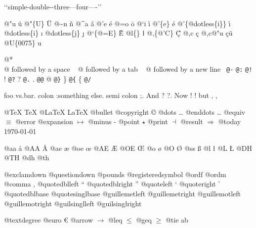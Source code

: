 \documentclass{book}
\begin{document}
`\hbox{}`simple-double-\hbox{}-three---four----'\hbox{}'\leavevmode{}\\

%
%
%
%

@"u \"{u} 
@"\{U\} \"{U} 
@\~{}n \~{n}
@\^{}a \^{a}
@'e \'{e}
@=o \={o}
@`i \`{i}
@'\{e\} \'{e}
@'\{@dotless\{i\}\} \'{\i{}} 
@dotless\{i\} \i{}
@dotless\{j\} \j{}
@`\{@=E\} \`{\={E}} 
@l\{\} \l{}
@,\{@'C\} \c{\'{C}}
@,c \c{c}
@,c@"u \c{c}\"{u} \leavevmode{}\\

@U\{0075\} u

@* \leavevmode{}\\
@ followed by a space
\ {}
@ followed by a tab
\ {}
@ followed by a new line
\ {}\texttt{@-} \-{}
\texttt{@:} \@
\texttt{@!} \@!
\texttt{@?} \@?
\texttt{@.} \@.
\texttt{@@} @
\texttt{@\}} \}
\texttt{@\{} \{
\texttt{@/} 

foo vs.\@ bar. 
colon :\@And something else.
semi colon ;\@.
And ? ?\@.
Now ! !\@@
but , ,\@

@TeX \TeX{}
@LaTeX \LaTeX{}
@bullet \textbullet{}
@copyright \copyright{}
@dots \dots{}\@
@enddots \dots{}
@equiv $\equiv{}$
@error 
@expansion $\mapsto{}$
@minus -
@point $\star{}$
@print $\dashv{}$
@result $\Rightarrow{}$
@today \today{}

@aa \aa{}
@AA \AA{}
@ae \ae{}
@oe \oe{}
@AE \AE{}
@OE \OE{}
@o \o{}
@O \O{}
@ss \ss{}
@l \l{}
@L \L{}
@DH \DH{}
@TH \TH{}
@dh \dh{}
@th \th{}

@exclamdown \textexclamdown{}
@questiondown \textquestiondown{}
@pounds \textsterling{}
@registeredsymbol \circledR{}
@ordf \textordfeminine{}
@ordm \textordmasculine{}
@comma ,
@quotedblleft \textquotedblleft{}
@quotedblright \textquotedblright{}
@quoteleft \textquoteleft{}
@quoteright \textquoteright{}
@quotedblbase \quotedblbase{}
@quotesinglbase \quotesinglbase{}
@guillemetleft \guillemotleft{}
@guillemetright \guillemotright{}
@guillemotleft \guillemotleft{}
@guillemotright \guillemotright{}
@guilsinglleft \guilsinglleft{}
@guilsinglright \guilsinglright{}

@textdegree \textdegree{}
@euro \euro{}
@arrow $\rightarrow{}$
@leq $\leq{}$
@geq $\geq{}$
@tie a\hbox{}b
\end{document}
